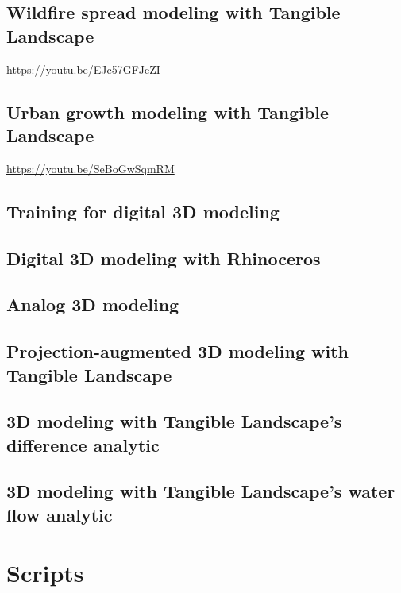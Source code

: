 \documentclass[prodmode,acmtochi]{acmsmall} %
\begin{document}
\subsection{Wildfire spread modeling with Tangible Landscape}\label{videos:fire}
\url{https://youtu.be/EJc57GFJeZI}

\subsection{Urban growth modeling with Tangible Landscape}\label{videos:urban}
\url{https://youtu.be/SeBoGwSqmRM}

\subsection{Training for digital 3D modeling}\label{videos:training}

\subsection{Digital 3D modeling with Rhinoceros}\label{videos:digital}

\subsection{Analog 3D modeling}\label{videos:analog}

\subsection{Projection-augmented 3D modeling with Tangible Landscape}\label{videos:augmented}

\subsection{3D modeling with Tangible Landscape's difference analytic}\label{videos:difference}

\subsection{3D modeling with Tangible Landscape's water flow analytic}\label{videos:water}

\vfill

\clearpage

\section{Scripts}\label{appendix:scripts}
\end{document}
